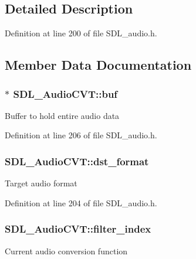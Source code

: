 \subsection{Detailed Description}


Definition at line 200 of file S\-D\-L\-\_\-audio.\-h.



\subsection{Member Data Documentation}
\hypertarget{struct_s_d_l___audio_c_v_t_a080db27b929efa983c5161360ffce310}{
\subsubsection[{buf}]{$\ast$ S\-D\-L\-\_\-\-Audio\-C\-V\-T\-::buf}}\label{struct_s_d_l___audio_c_v_t_a080db27b929efa983c5161360ffce310}
Buffer to hold entire audio data 

Definition at line 206 of file S\-D\-L\-\_\-audio.\-h.

\hypertarget{struct_s_d_l___audio_c_v_t_a8f890d017be857a3b048bf00525736c6}{
\subsubsection[{dst\-\_\-format}]{ S\-D\-L\-\_\-\-Audio\-C\-V\-T\-::dst\-\_\-format}}\label{struct_s_d_l___audio_c_v_t_a8f890d017be857a3b048bf00525736c6}
Target audio format 

Definition at line 204 of file S\-D\-L\-\_\-audio.\-h.

\hypertarget{struct_s_d_l___audio_c_v_t_a35093b3ad3331c17416c593a76012b63}{
\subsubsection[{filter\-\_\-index}]{ S\-D\-L\-\_\-\-Audio\-C\-V\-T\-::filter\-\_\-index}}\label{struct_s_d_l___audio_c_v_t_a35093b3ad3331c17416c593a76012b63}
Current audio conversion function 

